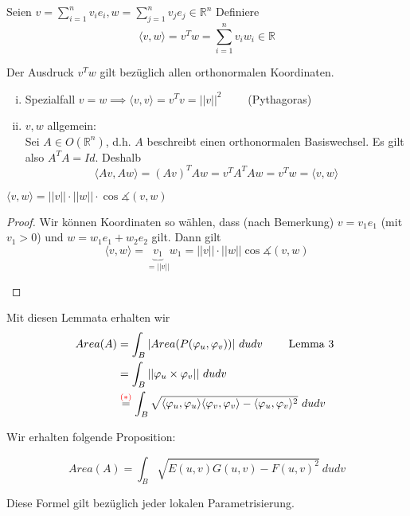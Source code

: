 \documentclass[../main.tex]{subfiles}
\begin{document}
\begin{einschub}
    Seien $v = \sum \limits_{i=1}^n v_ie_i, w = \sum \limits_{j=1}^n v_je_j \in \mathbb{R}^n$ 
    Definiere
    $$\langle v,w\rangle = v^Tw = \sum \limits_{i=1}^n v_iw_i \in \mathbb{R}$$
    \begin{remark}
        Der Ausdruck $v^Tw$ gilt bezüglich allen orthonormalen Koordinaten.
    \end{remark}
    \begin{enumerate}[i)]
        \item Spezialfall $v=w \implies \langle v,v \rangle = v^Tv = ||v||^2 \qquad$ (Pythagoras)
        \item $v,w$ allgemein: \\
        Sei $A \in O(\mathbb{R}^n)$, d.h. $A$ beschreibt einen orthonormalen Basiswechsel. Es gilt also
        $A^TA = Id$. Deshalb
        $$\langle Av, Aw \rangle = (Av)^TAw = v^TA^TAw=v^Tw = \langle v,w\rangle $$
    \end{enumerate}
    \begin{lemma}
        $\langle v,w \rangle = ||v||\cdot ||w|| \cdot \cos \measuredangle (v,w)$
    \end{lemma}
    \begin{proof}
        \begin{minipage}[t]{0.8\columnwidth}
            Wir können Koordinaten so wählen, dass (nach Bemerkung) $v=v_1e_1$ (mit $v_1>0$) und $w=w_1e_1+w_2e_2$ gilt.
            Dann gilt
            $$\langle v,w \rangle = \underbrace{v_1}_{=||v||}w_1 = ||v|| \cdot ||w|| \cos \measuredangle(v,w)$$
            \end{minipage}
        \begin{minipage}[t]{0.15\columnwidth}
            \begin{figure}[H]
                \centering
                \def\svgwidth{\textwidth}
                
            \end{figure}
        \end{minipage}

    \end{proof}
    Mit diesen Lemmata erhalten wir
    \begin{align*}
        Area(A) &= \int _B |Area(P(\varphi _u, \varphi _v))|\ dudv \qquad \text { Lemma 3 }\\
        &= \int _B ||\varphi _u \times \varphi _v || \ dudv \\
        &\overset{\textcolor{red}{(*)}}{=} \int _B \sqrt{\langle \varphi _u, \varphi_u \rangle \langle \varphi _v, \varphi _v\rangle- \langle \varphi _u, \varphi_v\rangle ^2} \ dudv
    \end{align*}
\end{einschub}
Wir erhalten folgende Proposition:
\begin{proposition}
    $$Area(A) = \int _B \sqrt{E(u,v)G(u,v)-F(u,v)^2}\ dudv$$
\end{proposition}
\begin{remark}
    Diese Formel gilt bezüglich jeder lokalen Parametrisierung.
\end{remark}
\end{document}
